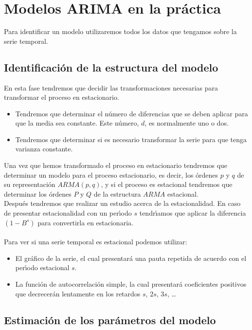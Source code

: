 %
%

\section{Modelos ARIMA en la pr\'actica}

Para identificar un modelo utilizaremos todos los datos que tengamos sobre la
serie temporal.

\subsection{Identificaci\'on de la estructura del modelo}

En esta fase tendremos que decidir las transformaciones necesarias para
transformar el proceso en estacionario.
\begin{itemize}
\item Tendremos que determinar el n\'umero de diferencias que se deben aplicar
para que la media sea constante. Este n\'umero, $d$, es normalmente uno o dos.
\item Tendremos que determinar si es necesario transformar la serie para que
tenga varianza constante.
\end{itemize}
%
\newpage
%
Una vez que hemos transformado el proceso en estacionario tendremos que
determinar un modelo para el proceso estacionario, es decir, los \'ordenes $p$ y
$q$ de su representaci\'on $ARMA(p,q)$, y si el proceso es estacional tendremos
que determinar los \'ordenes $P$ y $Q$ de la estructura $ARMA$ estacional.\\

Despu\'es tendremos que realizar un estudio acerca de la estacionalidad. En
caso de presentar estacionalidad con un per\'{\i}odo $s$ tendr\'{\i}amos que 
aplicar la diferencia $(1-B^s)$ para convertirla en estacionaria.\\ \\
%
Para ver si una serie temporal es estacional podemos utilizar:
\begin{itemize}
\item El gr\'afico de la serie, el cual presentar\'a una pauta repetida de
acuerdo con el per\'{\i}odo estacional $s$.
\item La funci\'on de autocorrelaci\'on simple, la cual presentar\'a
coeficientes positivos que decrecer\'an lentamente en los retardos $s$, $2s$,
$3s$, \dots
\end{itemize}

\subsection{Estimaci\'on de los par\'ametros del modelo}

